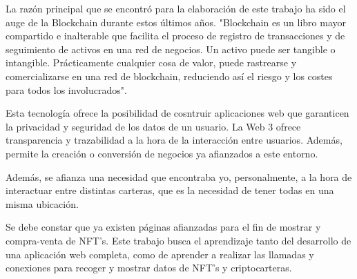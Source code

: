 La razón principal que se encontró para la elaboración de este trabajo ha sido 
el auge de la Blockchain durante estos últimos años. "Blockchain es un libro 
mayor compartido e inalterable que facilita el proceso de registro de 
transacciones y de seguimiento de activos en una red de negocios. Un activo 
puede ser tangible o intangible. Prácticamente cualquier cosa de valor, puede 
rastrearse y comercializarse en una red de blockchain, reduciendo así el 
riesgo y los costes para todos los involucrados"\cite{ibmWeb3}. 

Esta tecnología ofrece la posibilidad de cosntruir aplicaciones web que garanticen
la privacidad y seguridad de los datos de un usuario. La Web 3 ofrece transparencia
y trazabilidad a la hora de la interacción entre usuarios. Además, permite la 
creación o conversión de negocios ya afianzados a este entorno.

Además, se afianza una necesidad que encontraba yo, personalmente, a la hora de
interactuar entre distintas carteras, que es la necesidad de tener todas en una 
misma ubicación.

Se debe constar que ya existen páginas afianzadas para el fin de mostrar y 
compra-venta de NFT's. Este trabajo busca el aprendizaje tanto del desarrollo 
de una aplicación web completa, como de aprender a realizar las llamadas y 
conexiones para recoger y mostrar datos de NFT's\cite{bbcNFTs} y 
criptocarteras\cite{moralisWallets}.